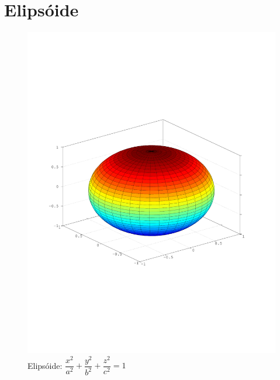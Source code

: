 \section{Elipsóide} %
\label{sec:elipsoide}
\begin{definicao}
\end{definicao}
\begin{figure}[!h]
	\centering
	\caption{Elipsóide: $\dfrac{x^2}{a^2} + \dfrac{y^2}{b^2} + \dfrac{z^2}{c^2} = 1$}
	\includegraphics[scale=0.8]{quadricas/elipsoide.pdf}
\end{figure}

